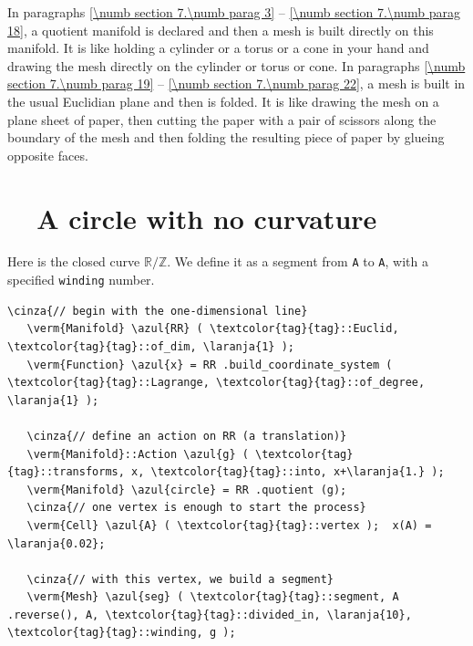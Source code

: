 In paragraphs \ref{\numb section 7.\numb parag 3} -- \ref{\numb section 7.\numb parag 18},
a quotient manifold is declared and then a mesh is built directly on this manifold.
It is like holding a cylinder or a torus or a cone in your hand and drawing the mesh
directly on the cylinder or torus or cone.
In paragraphs \ref{\numb section 7.\numb parag 19} -- \ref{\numb section 7.\numb parag 22},
a mesh is built in the usual Euclidian plane and then is folded.
It is like drawing the mesh on a plane sheet of paper, then cutting the paper with a pair of
scissors along the boundary of the mesh and then folding the resulting piece of paper
by glueing opposite faces.


\section{~~A circle with no curvature}\label{\numb section 7.\numb parag 1}

Here is the closed curve $ \mathbb{R}/{\mathbb Z} $.
We define it as a segment from {\small\tt A} to {\small\tt A}, with a specified
{\small\tt winding} number.

\begin{Verbatim}[commandchars=\\\{\},formatcom=\small\tt,frame=single,
   label=parag-\ref{\numb section 7.\numb parag 1}.cpp,rulecolor=\color{moldura},
   baselinestretch=0.94,framesep=2mm                                            ]
   \cinza{// begin with the one-dimensional line}
   \verm{Manifold} \azul{RR} ( \textcolor{tag}{tag}::Euclid, \textcolor{tag}{tag}::of_dim, \laranja{1} );
   \verm{Function} \azul{x} = RR .build_coordinate_system ( \textcolor{tag}{tag}::Lagrange, \textcolor{tag}{tag}::of_degree, \laranja{1} );

   \cinza{// define an action on RR (a translation)}
   \verm{Manifold}::Action \azul{g} ( \textcolor{tag}{tag}::transforms, x, \textcolor{tag}{tag}::into, x+\laranja{1.} );
   \verm{Manifold} \azul{circle} = RR .quotient (g);
   \cinza{// one vertex is enough to start the process}
   \verm{Cell} \azul{A} ( \textcolor{tag}{tag}::vertex );  x(A) = \laranja{0.02};

   \cinza{// with this vertex, we build a segment}
   \verm{Mesh} \azul{seg} ( \textcolor{tag}{tag}::segment, A .reverse(), A, \textcolor{tag}{tag}::divided_in, \laranja{10}, \textcolor{tag}{tag}::winding, g );
\end{Verbatim}

